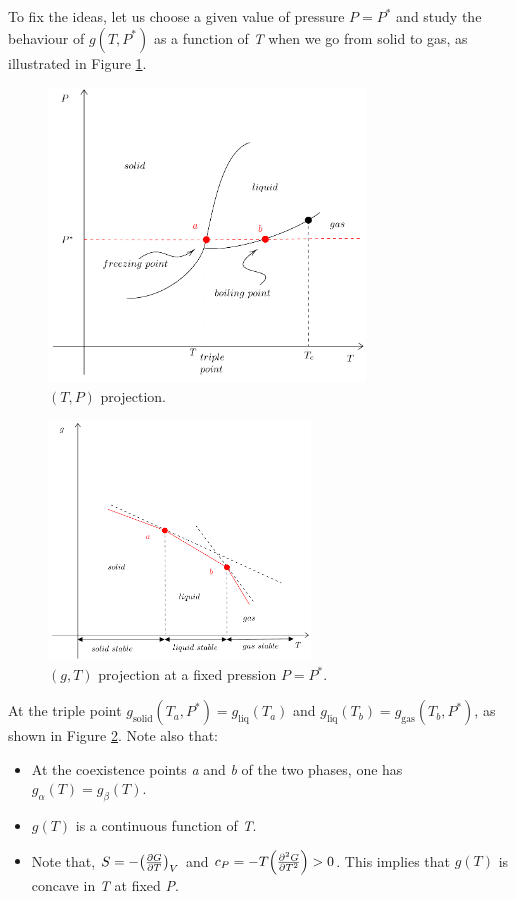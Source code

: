 \documentclass[../main/main.tex]{subfiles}
\begin{document}
To fix the ideas, let us choose a given value of pressure \( P = P^* \) and study the behaviour of \( g(T,P^*) \) as a function of \emph{T} when we go from solid to gas, as illustrated in Figure \ref{fig:2_2}.

\begin{figure}[h!]
\centering
\includegraphics[width=0.75\textwidth]{../lessons/2_image/2.pdf}
\caption{\label{fig:2_2} \( (T,P) \) projection.}
\end{figure}



\begin{figure}[h!]
\centering
\includegraphics[width=0.62\textwidth]{../lessons/2_image/3.pdf}
\caption{\label{fig:2_3}  \( (g,T) \) projection at a fixed pression \( P = P^* \).}
\end{figure}

At the triple point \( g_{\text{solid}}(T_ a, P^*) = g_{\text{liq}}(T_a) \) and \( g_{\text{liq}}(T_b) = g_{\text{gas}}(T_b , P^*) \), as shown in Figure \ref{fig:2_3}.
Note also that:
\begin{itemize}
\item At the coexistence points \emph{a} and \emph{b} of the two phases, one has \( g_ \alpha (T) = g_ \beta (T) \).
\item \( g(T) \) is a continuous function of \emph{T}.
\item Note that, \( S= -\qty(\pdv{G}{T} )_V  \)  and \( c_P = - T \qty(\pdv[2]{G}{T}) > 0 \). This implies that \( g(T) \) is concave in \emph{T} at fixed \emph{P}.
\end{itemize}
\end{document}

